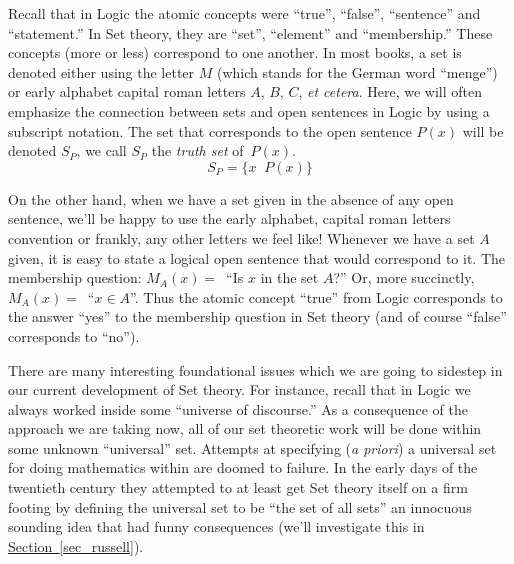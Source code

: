 \documentclass[10pt,]{book}
\theoremstyle{plain}
\theoremstyle{definition}
\theoremstyle{definition}
\numberwithin{equation}{section}
\newcommand{\suchthat}{\;  \;}
\begin{document}
    Recall that in Logic the atomic concepts were ``true'', ``false'',
    ``sentence'' and ``statement.'' In Set theory, they are ``set'',
    ``element'' and ``membership.'' These concepts (more or less) correspond to
    one another. In most books, a set is denoted either using the letter \(M\)
    (which stands for the German word ``menge'') or early alphabet capital roman
    letters \textemdash{} \(A\), \(B\), \(C\), \emph{et cetera}. Here, we will often emphasize the connection between
    sets and open sentences in Logic by using a subscript notation. The set that
    corresponds to the open sentence \(P(x)\) will be denoted \(S_P\), we call
    \(S_P\) the  \emph{truth set} of~\(P(x)\).
    \begin{equation*}
      S_P = \{ x \suchthat P(x) \}
    \end{equation*}
\par

    On the other hand, when we have a set given in the absence of any open
    sentence, we'll be happy to use the early alphabet, capital roman letters
    convention \textemdash{} or frankly, any other letters we feel like!
    Whenever we have a set \(A\) given, it is easy to state a logical
    open sentence that would correspond to it. The membership question: \(M_A(x) =
    \,\) ``Is \(x\) in the set \(A\)?'' Or, more succinctly,
    \(M_A(x) = \,\) ``\(x \in A\)''. Thus the atomic concept ``true'' from Logic
    corresponds to the answer ``yes'' to the membership question in Set theory
    (and of course ``false'' corresponds to ``no'').
\par

    There are many interesting foundational issues which we are going to
    sidestep in our current development of Set theory. For instance,
    recall that in Logic we always worked inside some
    ``universe of discourse.''
    As a consequence of the approach we are taking now, all of our set theoretic
    work will be done within some unknown
    ``universal'' set. Attempts at
    specifying (\emph{a priori}) a universal set for doing mathematics within
    are doomed to failure. In the early days of the twentieth century
    they attempted to at least get Set theory itself on a firm footing by
    defining the universal set to be ``the set of all sets'' \textemdash{} an innocuous
    sounding idea that had funny consequences (we'll investigate this in
    \hyperref[sec_russell]{Section~\ref{sec_russell}}).
\par
\end{document}
